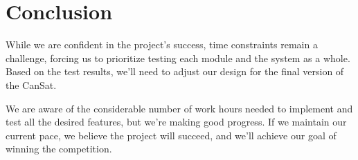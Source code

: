 \section{Conclusion}

While we are confident in the project's success, time constraints remain a challenge, forcing us to prioritize testing each module and the system as a whole. Based on the test results, we'll need to adjust our design for the final version of the CanSat.

We are aware of the considerable number of work hours needed to implement and test all the desired features, but we're making good progress. If we maintain our current pace, we believe the project will succeed, and we'll achieve our goal of winning the competition.


